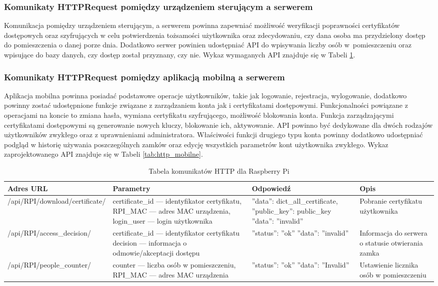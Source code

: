 \subsubsection{Komunikaty HTTPRequest pomiędzy urządzeniem sterującym a serwerem}
Komunikacja pomiędzy urządzeniem sterującym, a serwerem powinna  zapewniać możliwość weryfikacji poprawności certyfikatów dostępowych oraz szyfrujących w celu potwierdzenia tożsamości użytkownika oraz zdecydowaniu, czy dana osoba ma przydzielony dostęp do pomieszczenia o danej porze dnia. Dodatkowo serwer powinien udostępniać API do wpisywania liczby osób w~pomieszczeniu oraz wpisujące do bazy danych, czy dostęp został przyznany, czy nie. Wykaz wymaganych API znajduje się w Tabeli \ref{tab:http_raspberry}.
\subsubsection{Komunikaty HTTPRequest pomiędzy aplikacją mobilną a serwerem}
Aplikacja mobilna powinna posiadać podstawowe operacje użytkowników, takie jak logowanie, rejestracja, wylogowanie, dodatkowo powinny zostać udostępnione funkcje związane z zarządzaniem konta jak i certyfikatami dostępowymi. Funkcjonalności powiązane z operacjami na koncie to zmiana hasła, wymiana certyfikatu szyfrującego, możliwość blokowania konta. Funkcja zarządzającymi certyfikatami dostępowymi są generowanie nowych kluczy, blokowanie ich, aktywowanie. API powinno być dedykowane dla dwóch rodzajów użytkowników zwykłego oraz z uprawnieniami administratora. Właściwości funkcji drugiego typu konta powinny dodatkowo udostępniać podgląd w historię używania poszczególnych zamków oraz edycję wszystkich parametrów kont użytkownika zwykłego. Wykaz zaprojektowanego API znajduje się w Tabeli \ref{tab:http_mobilne}\cite{programowanie_aplikacji_webowych}.
\begin{longtable}[!ht]{|m{4cm}|m{4.5cm}|m{3.9cm}|m{2.8cm}|} 
	\caption{Tabela komunikatów HTTP dla Raspberry Pi}
	\label{tab:http_raspberry}\\
	\hline	
	Adres URL & Parametry & Odpowiedź & Opis \\	\hline
	/api/RPI/download/\-certificate/ & certificate\_id --- identyfikator certyfikatu, \newline RPI\_MAC --- adres MAC urządzenia, \newline login\_user --- login użytkownika & ''data'': dict\_all\_certificate, \newline ''public\_key'': public\_key \tablinia ''data'': ''invalid'' & Pobranie certyfikatu użytkownika \\ \hline
	/api/RPI/access\_decision/ & certificate\_id --- identyfikator certyfikatu \newline decision --- informacja o odmowie/akceptacji dostępu & ''status'': ''ok'' \tablinia ''data'': ''invalid'' & Informacja do serwera o statusie otwierania zamka \\ \hline
	/api/RPI/people\_counter/ & counter --- liczba osób w pomieszczeniu, \newline RPI\_MAC --- adres MAC urządzenia & ''status'': ''ok'' \tablinia ''data'': ''Invalid'' & Ustawienie licznika osób w pomieszczeniu \\ \hline
\end{longtable}


